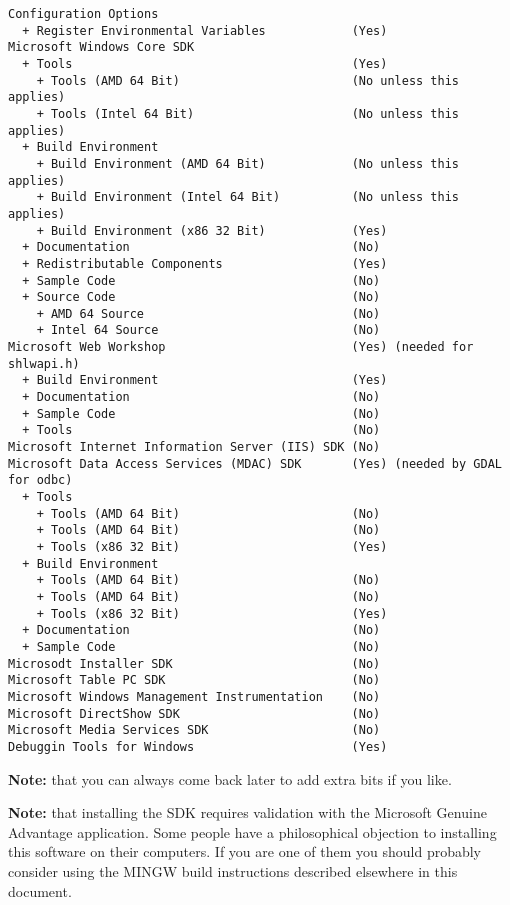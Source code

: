 \begin{verbatim}
Configuration Options
  + Register Environmental Variables            (Yes)
Microsoft Windows Core SDK
  + Tools                                       (Yes)
    + Tools (AMD 64 Bit)                        (No unless this applies)
    + Tools (Intel 64 Bit)                      (No unless this applies)
  + Build Environment
    + Build Environment (AMD 64 Bit)            (No unless this applies)
    + Build Environment (Intel 64 Bit)          (No unless this applies)
    + Build Environment (x86 32 Bit)            (Yes)
  + Documentation                               (No)
  + Redistributable Components                  (Yes)
  + Sample Code                                 (No)
  + Source Code                                 (No)
    + AMD 64 Source                             (No)
    + Intel 64 Source                           (No)
Microsoft Web Workshop                          (Yes) (needed for shlwapi.h)
  + Build Environment                           (Yes)
  + Documentation                               (No)
  + Sample Code                                 (No)
  + Tools                                       (No)
Microsoft Internet Information Server (IIS) SDK (No)
Microsoft Data Access Services (MDAC) SDK       (Yes) (needed by GDAL for odbc)
  + Tools
    + Tools (AMD 64 Bit)                        (No)
    + Tools (AMD 64 Bit)                        (No)
    + Tools (x86 32 Bit)                        (Yes)
  + Build Environment
    + Tools (AMD 64 Bit)                        (No)
    + Tools (AMD 64 Bit)                        (No)
    + Tools (x86 32 Bit)                        (Yes)
  + Documentation                               (No)
  + Sample Code                                 (No)
Microsodt Installer SDK                         (No)
Microsoft Table PC SDK                          (No)
Microsoft Windows Management Instrumentation    (No)
Microsoft DirectShow SDK                        (No)
Microsoft Media Services SDK                    (No)
Debuggin Tools for Windows                      (Yes)
\end{verbatim}

\textbf{Note:} that you can always come back later to add extra bits if you like.

\textbf{Note:} that installing the SDK requires validation with the 
Microsoft Genuine Advantage application. Some people have a philosophical 
objection to installing this software on their computers. If you are one 
of them you should probably consider using the MINGW build instructions 
described elsewhere in this document.


